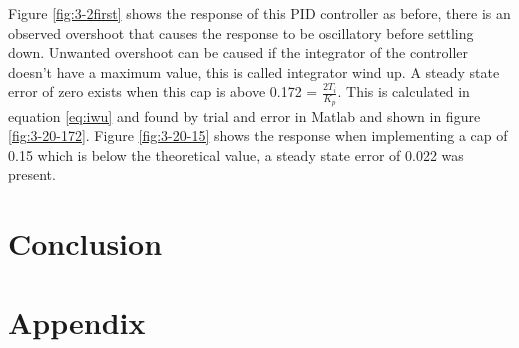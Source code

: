 \documentclass[twoside,twocolumn]{article}
\begin{document}
Figure \ref{fig:3-2first} shows the response of this PID controller as before, there is an observed overshoot that causes the response to be oscillatory before settling down.
Unwanted overshoot can be caused if the integrator of the controller doesn't have a maximum value, this is called integrator wind up. A steady state error of zero exists when this cap is above 0.172 = $\frac{2T_i}{K_p}$. This is calculated in equation \ref{eq:iwu} and found by trial and error in Matlab and shown in figure \ref{fig:3-20-172}. Figure \ref{fig:3-20-15} shows the response when implementing a cap of 0.15 which is below the theoretical value, a steady state error of 0.022 was present.  

\section{Conclusion}


\section{Appendix}


\end{document}
